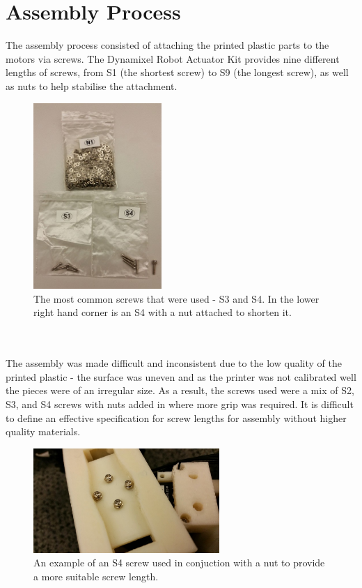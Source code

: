 \documentclass[]{article}
\begin{document}
\section{Assembly Process}
The assembly process consisted of attaching the printed plastic parts to the motors via screws. The Dynamixel Robot Actuator Kit provides nine different lengths of screws, from S1 (the shortest screw) to S9 (the longest screw), as well as nuts to help stabilise the attachment.
\begin{figure}[h]
\centering
\includegraphics[height=200pt]{report_images/screws.jpg}
\caption{The most common screws that were used - S3 and S4. In the lower right hand corner is an S4 with a nut attached to shorten it.}
\end{figure}
\\
\\
The assembly was made difficult and inconsistent due to the low quality of the printed plastic - the surface was uneven and as the printer was not calibrated well the pieces were of an irregular size. As a result, the screws used were a mix of S2, S3, and S4 screws with nuts added in where more grip was required. It is difficult to define an effective specification for screw lengths for assembly without higher quality materials.
\begin{figure}[h]
\centering
\includegraphics[width=200pt]{report_images/screw_nut.jpg}
\caption{An example of an S4 screw used in conjuction with a nut to provide a more suitable screw length.}
\end{figure} 
\end{document}
